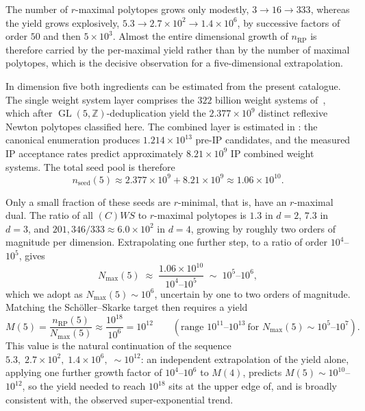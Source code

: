 \documentclass[appliedmath,article,submit,moreauthors]{Definitions/mdpi}
\newcommand{\Z}{\mathbb{Z}}
\newcommand{\GL}{\operatorname{GL}}
\begin{document}
The number of \(r\)-maximal polytopes grows only modestly, \(3\to16\to333\),
whereas the yield grows explosively,
\(5.3\to2.7\times10^{2}\to1.4\times10^{6}\), by successive factors of order
\(50\) and then \(5\times10^{3}\). Almost the entire dimensional growth of
\(n_{\mathrm{RP}}\) is therefore carried by the per-maximal yield rather than by
the number of maximal polytopes, which is the decisive observation for a
five-dimensional extrapolation.

In dimension five both ingredients can be estimated from the present catalogue.
The single weight system layer comprises the \(322\) billion weight systems
of~\cite{Scholler2019}, which after \(\GL(5,\Z)\)-deduplication yield the
\(2.377\times10^{9}\) distinct reflexive Newton polytopes classified here. The
combined layer is estimated in : the canonical
enumeration produces \(1.214\times10^{13}\) pre-IP candidates, and the measured
IP acceptance rates predict approximately \(8.21\times10^{9}\) IP combined
weight systems. The total seed pool is therefore
\[
    n_{\mathrm{seed}}(5)\approx
    2.377\times10^{9}+8.21\times10^{9}\approx1.06\times10^{10}.
\]

Only a small fraction of these seeds are \(r\)-minimal, that is, have an
\(r\)-maximal dual. The ratio of all \((C)WS\) to \(r\)-maximal polytopes is
\(1.3\) in \(d=2\), \(7.3\) in \(d=3\), and
\(201{,}346/333\approx6.0\times10^{2}\) in \(d=4\), growing by roughly two
orders of magnitude per dimension. Extrapolating one further step, to a ratio of
order \(10^{4}\)--\(10^{5}\), gives
\[
    N_{\max}(5)\;\approx\;\frac{1.06\times10^{10}}{10^{4}\text{--}10^{5}}\;\sim\;10^{5}\text{--}10^{6},
\]
which we adopt as \(N_{\max}(5)\sim10^{6}\), uncertain by one to two orders of
magnitude. Matching the Sch\"oller--Skarke target then requires a yield
\[
    M(5)=\frac{n_{\mathrm{RP}}(5)}{N_{\max}(5)}\approx\frac{10^{18}}{10^{6}}=10^{12}\qquad(\text{range }10^{11}\text{--}10^{13}\ \text{for }N_{\max}(5)\sim10^{5}\text{--}10^{7}).
\]
This value is the natural continuation of the sequence
\(5.3,\;2.7\times10^{2},\;1.4\times10^{6},\;\sim\!10^{12}\): an independent
extrapolation of the yield alone, applying one further growth factor of
\(10^{4}\)--\(10^{6}\) to \(M(4)\), predicts \(M(5)\sim10^{10}\)--\(10^{12}\),
so the yield needed to reach \(10^{18}\) sits at the upper edge of, and is
broadly consistent with, the observed super-exponential trend.
\end{document}
